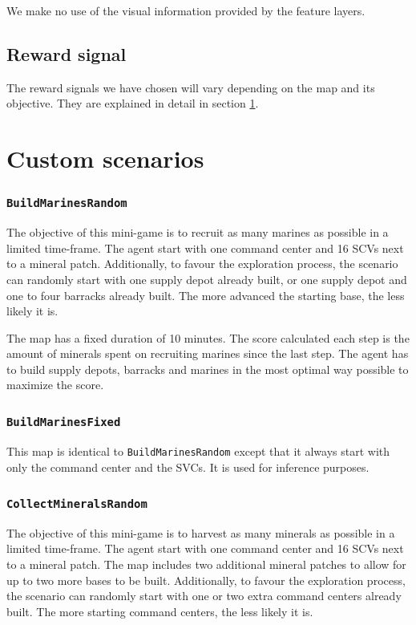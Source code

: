 We make no use of the visual information provided by the feature layers.

\subsection{Reward signal}

The reward signals we have chosen will vary depending on the map and its objective. They are explained in detail in section \ref{sec:mini-games}.

\section{Custom scenarios}
\label{sec:mini-games}


\subsubsection*{\texttt{BuildMarinesRandom}}

The objective of this mini-game is to recruit as many marines as possible in a limited time-frame. The agent start with one command center and 16 SCVs next to a mineral patch. Additionally, to favour the exploration process, the scenario can randomly start with one supply depot already built, or one supply depot and one to four barracks already built. The more advanced the starting base, the less likely it is.

The map has a fixed duration of 10 minutes. The score calculated each step is the amount of minerals spent on recruiting marines since the last step. The agent has to build supply depots, barracks and marines in the most optimal way possible to maximize the score.

\subsubsection*{\texttt{BuildMarinesFixed}}

This map is identical to \texttt{BuildMarinesRandom} except that it always start with only the command center and the SVCs. It is used for inference purposes.

\subsubsection*{\texttt{CollectMineralsRandom}}

The objective of this mini-game is to harvest as many minerals as possible in a limited time-frame. The agent start with one command center and 16 SCVs next to a mineral patch. The map includes two additional mineral patches to allow for up to two more bases to be built. Additionally, to favour the exploration process, the scenario can randomly start with one or two extra command centers already built. The more starting command centers, the less likely it is.

